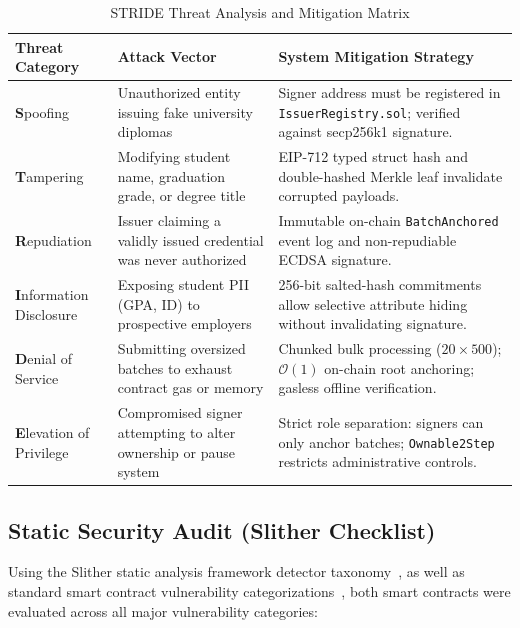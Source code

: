 \begin{table}[H]
\centering
\renewcommand{\arraystretch}{1.3}
\begin{tabular}{|p{3.2cm}|p{5.5cm}|p{5.8cm}|}
\hline
\textbf{Threat Category} & \textbf{Attack Vector} & \textbf{System Mitigation Strategy} \\
\hline
\textbf{S}poofing & Unauthorized entity issuing fake university diplomas & Signer address must be registered in \texttt{IssuerRegistry.sol}; verified against secp256k1 signature. \\
\hline
\textbf{T}ampering & Modifying student name, graduation grade, or degree title & EIP-712 typed struct hash and double-hashed Merkle leaf invalidate corrupted payloads. \\
\hline
\textbf{R}epudiation & Issuer claiming a validly issued credential was never authorized & Immutable on-chain \texttt{BatchAnchored} event log and non-repudiable ECDSA signature. \\
\hline
\textbf{I}nformation Disclosure & Exposing student PII (GPA, ID) to prospective employers & 256-bit salted-hash commitments allow selective attribute hiding without invalidating signature. \\
\hline
\textbf{D}enial of Service & Submitting oversized batches to exhaust contract gas or memory & Chunked bulk processing ($20 \times 500$); $\mathcal{O}(1)$ on-chain root anchoring; gasless offline verification. \\
\hline
\textbf{E}levation of Privilege & Compromised signer attempting to alter ownership or pause system & Strict role separation: signers can only anchor batches; \texttt{Ownable2Step} restricts administrative controls. \\
\hline
\end{tabular}
\caption{STRIDE Threat Analysis and Mitigation Matrix}
\label{tab:stride-matrix}
\end{table}

\subsection{Static Security Audit (Slither Checklist)}

Using the Slither static analysis framework detector taxonomy~\cite{Feist2019Slither}, as well as standard smart contract vulnerability categorizations~\cite{Luu2016SmartContracts}, both smart contracts were evaluated across all major vulnerability categories:


